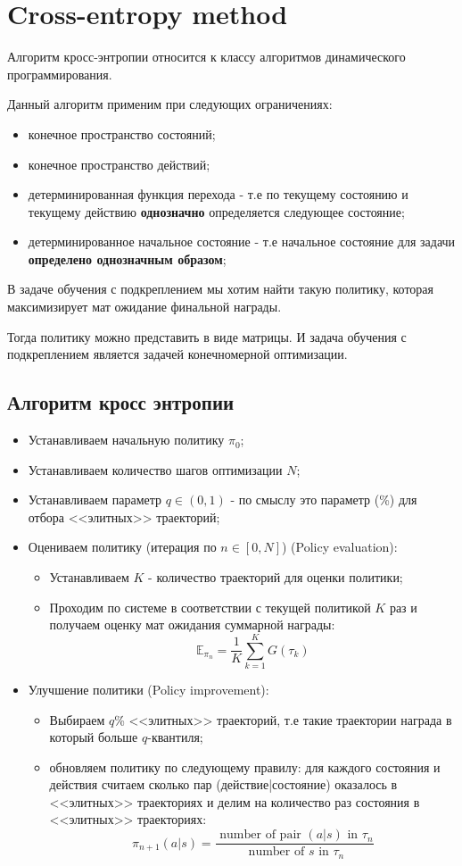\section{Cross-entropy method}
Алгоритм кросс-энтропии относится к классу алгоритмов динамического программирования.

Данный алгоритм применим при следующих ограничениях:
\begin{itemize}
	\item конечное пространство состояний;
	\item конечное пространство действий;
	\item детерминированная функция перехода - т.е по текущему состоянию и текущему действию \textbf{однозначно} определяется следующее состояние;
	\item детерминированное начальное состояние - т.е начальное состояние для задачи \textbf{определено однозначным образом}; 
\end{itemize}

В задаче обучения с подкреплением мы хотим найти такую политику, которая максимизирует мат ожидание финальной награды.

Тогда политику можно представить в виде матрицы. И задача обучения с подкреплением является задачей конечномерной оптимизации.

\subsection{Алгоритм кросс энтропии}

\begin{itemize}
	\item Устанавливаем начальную политику $\pi_0$;
	\item Устанавливаем количество шагов оптимизации $N$;
	\item Устанавливаем параметр $q \in (0, 1)$ - по смыслу это параметр (\%) для отбора <<элитных>> траекторий; 
	\item Оцениваем политику (итерация по $n \in [0, N]$) (Policy evaluation):
	\begin{itemize}
		\item Устанавливаем $K$ - количество траекторий для оценки политики;
		\item Проходим по системе в соответствии с текущей политикой $K$ раз и получаем оценку мат ожидания суммарной награды: $$\mathbb{E}_{\pi_n} = \frac{1}{K}\sum_{k=1}^{K}G(\tau_k)$$
	\end{itemize}
	\item Улучшение политики (Policy improvement):
	\begin{itemize}
		\item Выбираем $q$\% <<элитных>> траекторий, т.е такие траектории награда в который больше $q$-квантиля;
		\item обновляем политику по следующему правилу: для каждого состояния и действия считаем сколько пар (действие|состояние) оказалось в <<элитных>> траекториях и делим на количество раз состояния в <<элитных>> траекториях: 
		$$\pi_{n+1}(a|s) = \frac{ \textrm{ number of pair } (a|s) \textrm{ in }\tau_n}{ \textrm{ number of } s \textrm{ in } \tau_n}$$ 
	\end{itemize}
\end{itemize}

